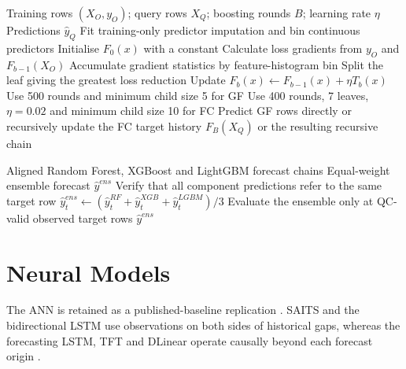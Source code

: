 \begin{algorithm}[H]
\caption{LightGBM reconstruction or recursive forecasting}
\label{alg:app-lightgbm}
\small
\begin{algorithmic}[1]
\Require Training rows $(X_O,y_O)$; query rows $X_Q$; boosting rounds $B$;
learning rate $\eta$
\Ensure Predictions $\hat y_Q$
\State Fit training-only predictor imputation and bin continuous predictors
\State Initialise $F_0(x)$ with a constant
    \State Calculate loss gradients from $y_O$ and $F_{b-1}(X_O)$
    \State Accumulate gradient statistics by feature-histogram bin
        \State Split the leaf giving the greatest loss reduction
    \EndWhile
    \State Update $F_b(x)\gets F_{b-1}(x)+\eta T_b(x)$
\EndFor
\State Use 500 rounds and minimum child size 5 for GF
\State Use 400 rounds, 7 leaves, $\eta=0.02$ and minimum child size 10 for FC
\State Predict GF rows directly or recursively update the FC target history
\State \Return $F_B(X_Q)$ or the resulting recursive chain
\end{algorithmic}
\end{algorithm}

\begin{algorithm}[H]
\caption{Unweighted voting-regression forecast ensemble}
\label{alg:app-unweighted-voting-regression}
\small
\begin{algorithmic}[1]
\Require Aligned Random Forest, XGBoost and LightGBM forecast chains
\Ensure Equal-weight ensemble forecast $\hat y^{ens}$
    \State Verify that all component predictions refer to the same target row
    \State $\hat y_t^{ens}\gets
    (\hat y_t^{RF}+\hat y_t^{XGB}+\hat y_t^{LGBM})/3$
\EndFor
\State Evaluate the ensemble only at QC-valid observed target rows
\State \Return $\hat y^{ens}$
\end{algorithmic}
\end{algorithm}

\section{Neural Models}

The ANN is retained as a published-baseline replication
\cite{rumelhart1986backprop}. SAITS and the bidirectional LSTM use observations
on both sides of historical gaps, whereas the forecasting LSTM, TFT and DLinear
operate causally beyond each forecast origin
\cite{du2023saits,hochreiter1997lstm,schuster1997bidirectional,lim2021tft,zeng2023}.

